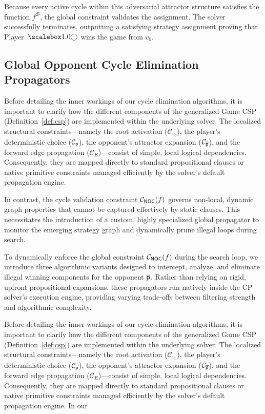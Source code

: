 \documentclass[a4paper,fleqn]{cas-sc}
\begin{document}
Because every active cycle within this adversarial attractor structure satisfies the function $f^\mathcal{B}$, the global constraint validates the assignment. The solver successfully terminates, outputting a satisfying strategy assignment proving that Player~$\even$ wins the game from $v_0$.


\subsection{Global Opponent Cycle Elimination Propagators}
\label{sec:global_propagators}

Before detailing the inner workings of our cycle elimination algorithms, it is important to clarify how the different components of the generalized Game CSP (Definition~\ref{def:csp}) are implemented within the underlying solver. The localized structural constraints—namely the root activation ($\mathcal{C}_{v_0}$), the player's deterministic choice ($\mathcal{C}_{\mathsf{p}}$), the opponent's attractor expansion ($\mathcal{C}_{\overline{\mathsf{p}}}$), and the forward edge propagation ($\mathcal{C}_E$)—consist of simple, local logical dependencies. Consequently, they are mapped directly to standard propositional clauses or native primitive constraints managed efficiently by the solver's default propagation engine. 

In contrast, the cycle validation constraint $\mathcal{C}_{{\textsf{NOC}}}(f)$ governs non-local, dynamic graph properties that cannot be captured effectively by static clauses. This necessitates the introduction of a custom, highly specialized global propagator to monitor the emerging strategy graph and dynamically prune illegal loops during search.

To dynamically enforce the global constraint $\mathcal{C}_{{\textsf{NOC}}}(f)$ during the search loop, we introduce three algorithmic variants designed to intercept, analyze, and eliminate illegal winning components for the opponent $\overline{\mathsf{p}}$. Rather than relying on rigid, upfront propositional expansions, these propagators run natively inside the CP solver's execution engine, providing varying trade-offs between filtering strength and algorithmic complexity.


Before detailing the inner workings of our cycle elimination algorithms, it is important to clarify how the different components of the generalized Game CSP (Definition~\ref{def:csp}) are implemented within the underlying solver. The localized structural constraints—namely the root activation ($\mathcal{C}_{v_0}$), the player's deterministic choice ($\mathcal{C}_{\mathsf{p}}$), the opponent's attractor expansion ($\mathcal{C}_{\overline{\mathsf{p}}}$), and the forward edge propagation ($\mathcal{C}_E$)—consist of simple, local logical dependencies. Consequently, they are mapped directly to standard propositional clauses or native primitive constraints managed efficiently by the solver's default propagation engine. In our 
\end{document}
